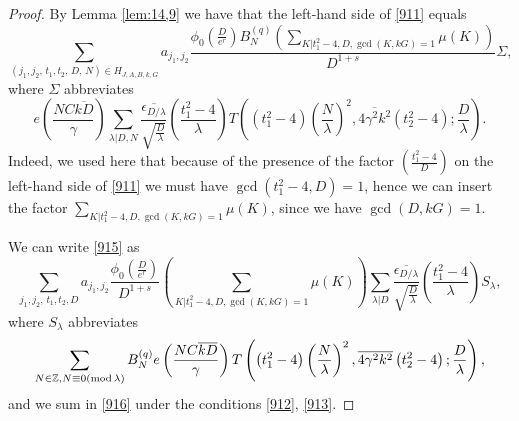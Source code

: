 \documentclass[12pt]{amsart}
\theoremstyle{definition}
\numberwithin{equation}{section}
\begin{document}
\begin{proof}By Lemma \ref{lem:14,9} we have that the left-hand side
of \eqref{911} equals
\begin{equation}\sum_{\left(j_1,j_2,\,t_1,t_2,\,D,\,N\right)\in H_{
J,A,B,k,G}}a_{j_1,j_2}\frac {\phi_0\left(\frac D{e^r}\right)B_N^{
(q)}\left(\sum_{K|t_1^2-4,D,\gcd\left(K,kG\right)=1}\mu\left(K\right
)\right)}{D^{1+s}}\Sigma ,\label{915}\end{equation}
where $\Sigma$ abbreviates
\[e\left(\frac {NC\overline {kD}}{\gamma}\right)\sum_{\lambda |D,
N}\frac {\overline {\epsilon_{D/\lambda}}}{\sqrt {\frac D{\lambda}}}\left
(\frac {t_1^2-4}{\lambda}\right)T\left(\left(t_1^2-4\right)\left(\frac
N{\lambda}\right)^2,\overline {4\gamma^2k^2}\left(t_2^2-4\right);\frac
D{\lambda}\right).\]
Indeed, we used here that because of the presence of the
factor $\left(\frac {t_1^2-4}D\right)$ on the left-hand side of \eqref{911} we
must have $\gcd\left(t_1^2-4,D\right)=1$, hence we can insert the
factor $\sum_{K|t_1^2-4,D,\gcd\left(K,kG\right)=1}\mu\left(K\right
)$, since we have $\gcd\left(D,kG\right)=1$.

We can write \eqref{915} as
\begin{equation}\sum_{j_1,j_2,\,t_1,t_2,D}a_{j_1,j_2}\frac {\phi_
0\left(\frac D{e^r}\right)}{D^{1+s}}\left(\sum_{K|t_1^2-4,D,\gcd\left
(K,kG\right)=1}\mu\left(K\right)\right)\sum_{\lambda |D}\frac {\overline {
\epsilon_{D/\lambda}}}{\sqrt {\frac D{\lambda}}}\left(\frac {t_1^
2-4}{\lambda}\right)S_{\lambda},\label{916}\end{equation}
where $S_{\lambda}$ abbreviates
\begin{equation}\sum_{N\in\mathbb{Z},N\equiv 0\left({\rm m}{\rm o}
{\rm d}\,\lambda\right)}B_N^{(q)}e\left(\frac {NC\overline {kD}}{
\gamma}\right)T\left(\left(t_1^2-4\right)\left(\frac N{\lambda}\right
)^2,\overline {4\gamma^2k^2}\left(t_2^2-4\right);\frac D{\lambda}\right
),\label{916,05)}\end{equation}
and we sum in \eqref{916} under the conditions \eqref{912}, \eqref{913}.


\end{proof}
\end{document}
